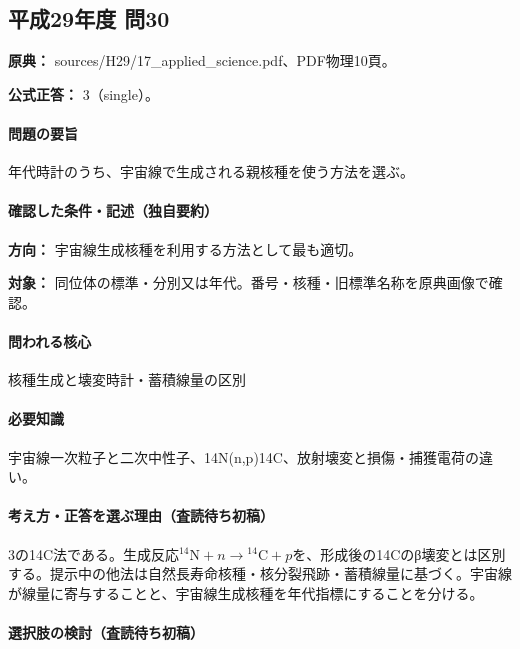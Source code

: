 \subsection{平成29年度 問30}
\label{q:h29-reg-applied-30}

\noindent\textbf{原典：} sources/H29/17\_applied\_science.pdf、PDF物理10頁。

\textbf{公式正答：} 3（single）。

\paragraph{問題の要旨} 年代時計のうち、宇宙線で生成される親核種を使う方法を選ぶ。

\paragraph{確認した条件・記述（独自要約）}\mbox{}\par

\noindent\textbf{方向：} 宇宙線生成核種を利用する方法として最も適切。\par

\noindent\textbf{対象：} 同位体の標準・分別又は年代。番号・核種・旧標準名称を原典画像で確認。\par

\paragraph{問われる核心} 核種生成と壊変時計・蓄積線量の区別

\paragraph{必要知識} 宇宙線一次粒子と二次中性子、14N(n,p)14C、放射壊変と損傷・捕獲電荷の違い。

\paragraph{考え方・正答を選ぶ理由（査読待ち初稿）} 3の14C法である。生成反応\({}^{14}\mathrm N+n\to{}^{14}\mathrm C+p\)を、形成後の14Cのβ壊変とは区別する。提示中の他法は自然長寿命核種・核分裂飛跡・蓄積線量に基づく。宇宙線が線量に寄与することと、宇宙線生成核種を年代指標にすることを分ける。

\paragraph{選択肢の検討（査読待ち初稿）}\mbox{}\par

